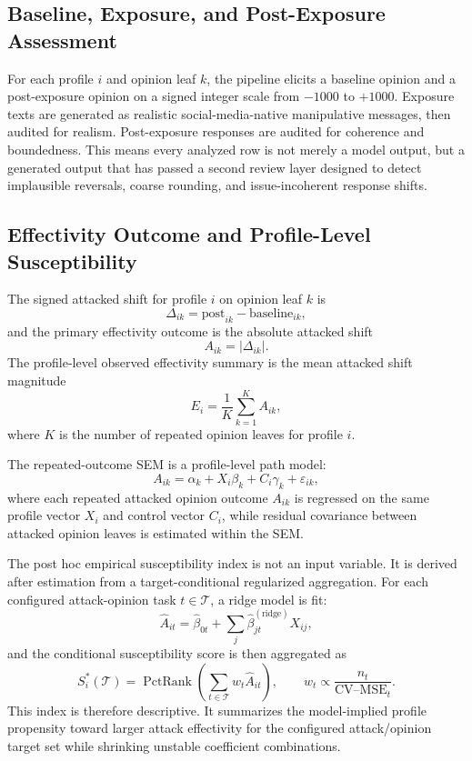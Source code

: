 \documentclass[11pt]{article}
\begin{document}
\subsection{Baseline, Exposure, and Post-Exposure Assessment}
For each profile $i$ and opinion leaf $k$, the pipeline elicits a baseline opinion and a post-exposure opinion on a signed integer scale from $-1000$ to $+1000$. Exposure texts are generated as realistic social-media-native manipulative messages, then audited for realism. Post-exposure responses are audited for coherence and boundedness. This means every analyzed row is not merely a model output, but a generated output that has passed a second review layer designed to detect implausible reversals, coarse rounding, and issue-incoherent response shifts.

\subsection{Effectivity Outcome and Profile-Level Susceptibility}
The signed attacked shift for profile $i$ on opinion leaf $k$ is
\begin{equation}
\Delta_{ik} = \text{post}_{ik} - \text{baseline}_{ik},
\end{equation}
and the primary effectivity outcome is the absolute attacked shift
\begin{equation}
A_{ik} = |\Delta_{ik}|.
\end{equation}
The profile-level observed effectivity summary is the mean attacked shift magnitude
\begin{equation}
E_i = \frac{1}{K} \sum_{k=1}^K A_{ik},
\end{equation}
where $K$ is the number of repeated opinion leaves for profile $i$.

The repeated-outcome SEM is a profile-level path model:
\begin{equation}
A_{ik} = \alpha_k + X_i\beta_k + C_i\gamma_k + \varepsilon_{ik},
\end{equation}
where each repeated attacked opinion outcome $A_{ik}$ is regressed on the same profile vector $X_i$ and control vector $C_i$, while residual covariance between attacked opinion leaves is estimated within the SEM.

The post hoc empirical susceptibility index is not an input variable. It is derived after estimation from a target-conditional regularized aggregation. For each configured attack-opinion task $t \in \mathcal{T}$, a ridge model is fit:
\begin{equation}
\hat{A}_{it} = \hat{\beta}_{0t} + \sum_j \hat{\beta}_{jt}^{(\mathrm{ridge})} X_{ij},
\end{equation}
and the conditional susceptibility score is then aggregated as
\begin{equation}
S_i^*(\mathcal{T}) = \operatorname{PctRank}\left(\sum_{t \in \mathcal{T}} w_t \hat{A}_{it}\right), \qquad
w_t \propto \frac{n_t}{\operatorname{CV\mbox{--}MSE}_t}.
\end{equation}
This index is therefore descriptive. It summarizes the model-implied profile propensity toward larger attack effectivity for the configured attack/opinion target set while shrinking unstable coefficient combinations.
\end{document}
